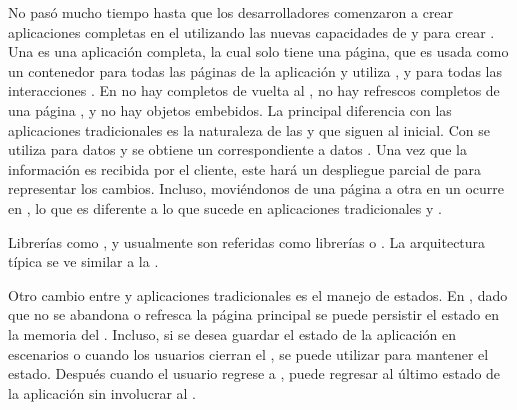No pasó mucho tiempo hasta que los desarrolladores comenzaron a crear aplicaciones completas en el \browserINT utilizando las nuevas capacidades de \javaScriptNAME y \htmlfive para crear \singlePageAppINT. Una \spa es una aplicación \webINT completa, la cual solo tiene una página, que es usada como un contenedor para todas las páginas \webINT de la aplicación y utiliza \javaScriptNAME, \htmlfive y \cssNAME para todas las interacciones \frontEndsAS. En \spas no hay \posts completos de vuelta al \serverAS, no hay refrescos completos de una página \webINT, y no hay objetos embebidos. La principal diferencia con las aplicaciones \webINT tradicionales es la naturaleza de las \requests y \responsesINT que siguen al \requestINT \httpNAME inicial. Con \spa se utiliza \ajaxNAME para \requestINT datos y se obtiene un \responsesINT correspondiente a datos \jsonNAME. Una vez que la información es recibida por el cliente, este hará un despliegue parcial de \htmlNAME para representar los cambios. Incluso, moviéndonos de una página a otra en un \spa ocurre en \clientSideAS, lo que es diferente a lo que sucede en aplicaciones tradicionales y \ria.

Librerías como \backbonejsNAME \emberjsNAME, y \angularjsNAME usualmente son referidas como librerías \clientSideAS \mvcAS o \mvvmAS. La arquitectura típica \clientSideAS \mvcAS se ve similar a la . 




Otro cambio entre \spa y aplicaciones \webINT tradicionales es el manejo de estados. En \spa, dado que no se abandona o refresca la página \webINT principal se puede persistir el estado en la memoria del \browserINT. Incluso, si se desea guardar el estado de la aplicación en escenarios \offline o cuando los usuarios cierran el \browserINT, se puede utilizar \htmlfive \storage para mantener el estado. Después cuando el usuario regrese a \online, puede regresar al último estado de la aplicación sin involucrar al \serverAS.

